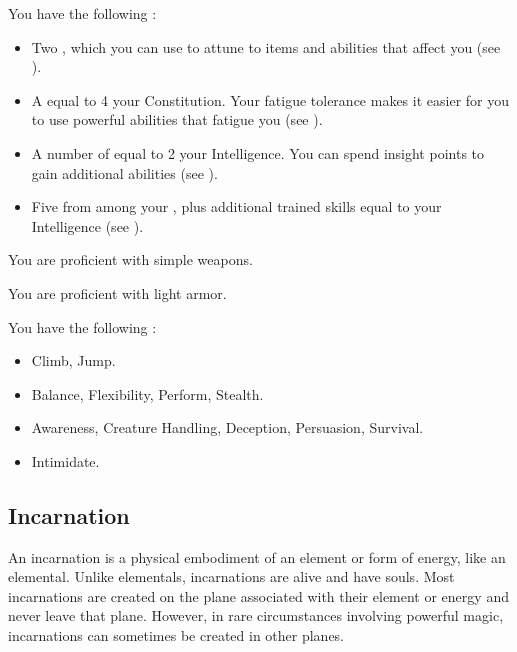              You have the following :
            \begin{itemize}
                \item Two , which you can use to attune to items and abilities that affect you (see ).
                \item A  equal to 4 \add your Constitution.
                    Your fatigue tolerance makes it easier for you to use powerful abilities that fatigue you (see ).
                \item A number of  equal to 2 \add your Intelligence.
                    You can spend insight points to gain additional abilities (see ).
                \item Five  from among your , plus additional trained skills equal to your Intelligence (see ).
            \end{itemize}

            You are proficient with simple weapons.

            You are proficient with light armor.

            You have the following :
            \begin{itemize}
                \item {} Climb, Jump.
                \item {} Balance, Flexibility, Perform, Stealth.
                \item {} Awareness, Creature Handling, Deception, Persuasion, Survival.
                \item {} Intimidate.
            \end{itemize}

    \subsection{Incarnation}

        An incarnation is a physical embodiment of an element or form of energy, like an elemental.
        Unlike elementals, incarnations are alive and have souls.
        Most incarnations are created on the plane associated with their element or energy and never leave that plane.
        However, in rare circumstances involving powerful magic, incarnations can sometimes be created in other planes.

